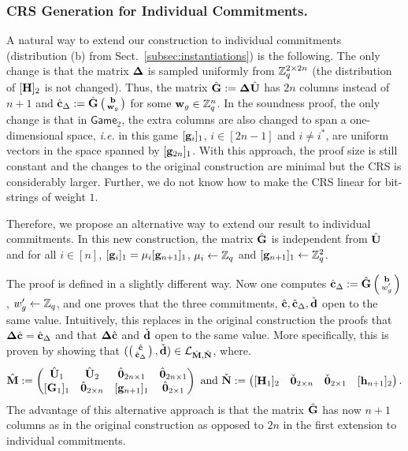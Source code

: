 \subsubsection{CRS Generation for Individual Commitments.}
A natural way to extend our construction to individual commitments (distribution (b) from Sect.\ \ref{subsec:instantiations}) is the following. The only change is that the matrix $\mathbf{{\Delta}}$ is sampled uniformly from  $\mathbb{Z}_q^{2 \times 2n}$ (the distribution of $[{\mathbf{{H}}}]_2$ is not changed). Thus, the matrix 
${\hat{\mathbf{{G}}}}:=\mathbf{{\Delta}} {\hat{\mathbf{{U}}}}$ has $2n$ columns instead of $n+1$ and 
${\hat{\mathbf{c}}}_{\Delta} := \hat{\mathbf{{G}}} \left(\begin{smallmatrix}\mathbf{b} \\ \mathbf{w}_g\end{smallmatrix}\right)$ for some $\mathbf{w}_g \in \mathbb{Z}_q^{n}$.   
In the soundness proof, the only change is that in $\mathsf{Game}_2$, the extra columns are also changed to span a one-dimensional space, \textit{i.e.} in this game $[\mathbf{g}_{i}]_1$, $i \in [2n-1]$ and $i \neq i^*$, are uniform vectors in the space spanned by $[\mathbf{g}_{2n}]_1$.
With this approach, the proof size is still constant and the changes to the original construction are minimal but the CRS is considerably larger. Further, we do not know how to make the CRS linear for bit-strings of weight $1$. 

Therefore, we propose an alternative way to extend our result to individual commitments. In this new construction, the matrix $\hat{\mathbf{{G}}}$ is independent from ${\hat{\mathbf{{U}}}}$ and for all $i \in [n]$, $[\mathbf{g}_{i}]_1 = \mu_i [\mathbf{g}_{n+1}]_1$, $\mu_i \gets \mathbb{Z}_q$ and   $[\mathbf{g}_{n+1}]_1\gets\mathbb{Z}_q^2$. 

The proof is defined in a slightly different way. Now one computes ${\hat{\mathbf{c}}}_\Delta:=\hat{\mathbf{{G}}}\left(\begin{smallmatrix}\mathbf{b}\\w'_g\end{smallmatrix}\right)$, $w'_g\gets\mathbb{Z}_q$, and one proves that the three commitments, ${\hat{\mathbf{c}}},{\hat{\mathbf{c}}}_\Delta,\check{\mathbf{d}}$ open to the same value.  Intuitively, this replaces in the original construction the proofs that $\mathbf{{\Delta}}{\hat{\mathbf{c}}}={\hat{\mathbf{c}}}_\Delta$ and that $\mathbf{{\Delta}}{\hat{\mathbf{c}}}$ and $\check{\mathbf{d}}$ open to the same value. More specifically, this is proven by showing that $(\left(\begin{smallmatrix}{\hat{\mathbf{c}}}\\{\hat{\mathbf{c}}}_\Delta\end{smallmatrix}\right), \check{\mathbf{d}})\in\mathcal{L}_{{\hat{\mathbf{{M}}}},\check{\mathbf{{N}}}}$, where.
$$
\hmatr{M} := 
\pmatri
{
    \hmatr{U}_1 & \hmatr{U}_2           & \hmatr{0}_{2n\times 1} & \hmatr{0}_{2n\times 1}\\
    [\vecb{G}_1]_1      & \hmatr{0}_{2\times n} & [\vecb{g}_{n+1}]_1             & \hmatr{0}_{2\times 1}\\
}
\text{ and }
\cmatr{N} :=
\pmatri{
    [\vecb{H}_1]_2      & \cmatr{0}_{2\times n} & \cmatr{0}_{2\times 1}  & [\vecb{h}_{n+1}]_2
}.
$$
The advantage of this alternative approach is that the matrix $\hat{\mathbf{{G}}}$ has now $n+1$ columns as in the original construction as opposed to $2n$ in the first extension to individual commitments.  


